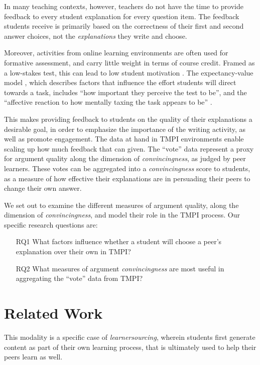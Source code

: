 \documentclass[sigconf]{acmart}
\begin{document}
In many teaching contexts, however, teachers do not have the time to provide 
feedback to every student explanation for every question item. 
The feedback students receive is primarily based on the correctness of their 
first and second answer choices, not the \textit{explanations} they write and 
choose.

Moreover, activities from online learning environments are often used for 
formative assessment, and carry little weight in terms of course credit. 
Framed as a low-stakes test, this can lead to low student motivation 
\cite{wise_low_2005}. 
The expectancy-value model \cite{pintrich_dynamic_1989}, which 
describes factors that influence the effort students will direct towards a 
task, includes ``how important they perceive the test to be'', and the 
``affective reaction to how mentally taxing the task appears to be'' 
\cite{wolf_consequence_1995}.

This makes providing feedback to students on the quality of their explanations 
a desirable goal, in order to emphasize the importance of the writing 
activity, as well as promote engagement.
The data at hand in TMPI environments enable scaling up how much feedback that 
can given. 
The ``vote'' data represent a proxy for argument quality along the dimension 
of \textit{convincingness}, as judged by peer learners. 
These votes can be aggregated into a \textit{convincingness} score to students, 
as a measure of how effective their explanations are in persuading their peers 
to change their own answer.

We set out to examine the different measures of argument quality, along the 
dimension of \textit{convincingness}, and model their role in the TMPI process. 
Our specific research questions are:
\begin{itemize}
	\item[RQ1] What factors influence whether a student will choose a peer's 
	explanation over their own in TMPI?
	\item[RQ2] What measures of argument \textit{convincingness} are most 
	useful in 
	aggregating the ``vote'' data from TMPI?
\end{itemize}


\section{Related Work}
This modality is a specific case of  
\textit{learnersourcing}\cite{weir_learnersourcing_2015}, wherein students first
generate content as part of their own learning process, that is ultimately used 
to help their peers learn as well.
\end{document}
